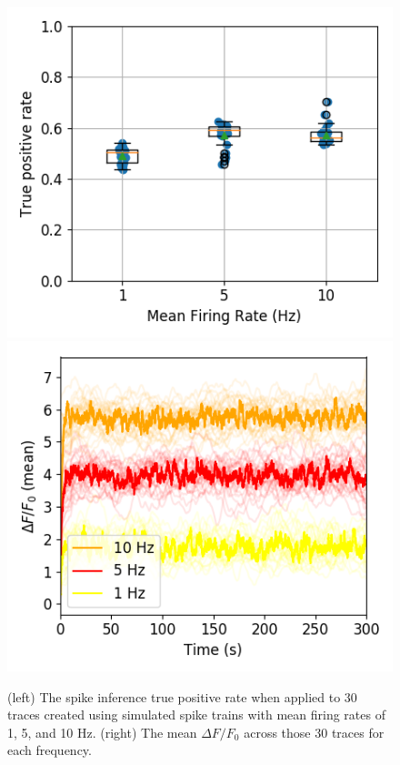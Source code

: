 \documentclass[a4paper,12pt]{article}
\theoremstyle{definition}
\begin{document}
\begin{figure}
  \includegraphics[width=0.5\linewidth]{figures/simulated_oasis_tp_paper.png}
  \includegraphics[width=0.5\linewidth]{figures/mean_fluorescence_comparison.png}
  \caption{(left) The spike inference true positive rate when applied to 30 traces created using simulated spike trains with mean firing rates of 1, 5, and 10 Hz. (right) The mean $\Delta F/F_0$ across those 30 traces for each frequency.}
  \label{}
\end{figure}
\end{document}
